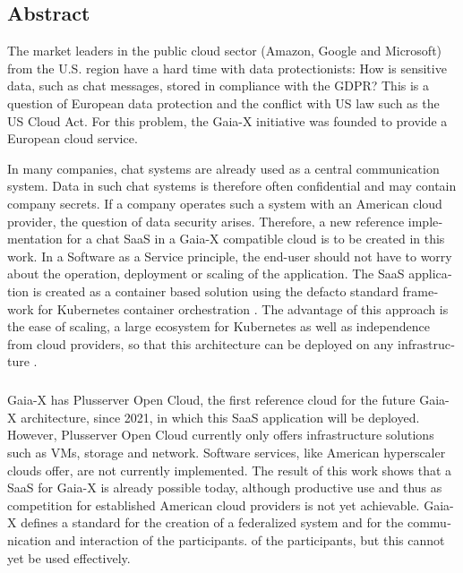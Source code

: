 

\begin{otherlanguage}{american}
	\chapter*{Abstract}
The market leaders in the public cloud sector (Amazon, Google and Microsoft) from the U.S. region
	have a hard time with data protectionists:
	How is sensitive data, such as chat messages, stored in compliance with the GDPR?
	This is a question of European data protection and the conflict with US law such as the US Cloud Act.
	For this problem, the Gaia-X initiative was founded to provide a European cloud service.

	In many companies, chat systems are already used as a central communication system.
	Data in such chat systems is therefore often confidential and may contain company secrets.
	If a company operates such a system with an American cloud provider, the question of data security arises.
	Therefore, a new reference implementation for a chat \ac{SaaS} in a Gaia-X compatible cloud is to be created in this work.
	In a Software as a Service principle, the end-user should not have to worry about the operation, deployment
	or scaling of the application. 
	The \ac{SaaS} application is created as a container based solution using the defacto standard framework for 
	Kubernetes container orchestration \cite{Burns2019}. The advantage of this approach is the ease of scaling,
	a large ecosystem for Kubernetes as well as independence from cloud providers, 
	so that this architecture can be deployed on any infrastructure \cite{Burns2019}.
	\paragraph{}
	Gaia-X has Plusserver Open Cloud, the first reference cloud for the future Gaia-X architecture, since 2021,
	in which this SaaS application will be deployed.	
	However, Plusserver Open Cloud currently only offers infrastructure solutions such as \acp{VM}, storage and network. 
	Software services, like American hyperscaler clouds offer, are not currently implemented.
	The result of this work shows that a \ac{SaaS} for Gaia-X is already possible today, 
	although productive use and thus as competition for established American cloud providers is not yet achievable. 
	Gaia-X defines a standard for the creation of a federalized system and for the communication and interaction of the participants. 
	of the participants, but this cannot yet be used effectively. 


\end{otherlanguage}
